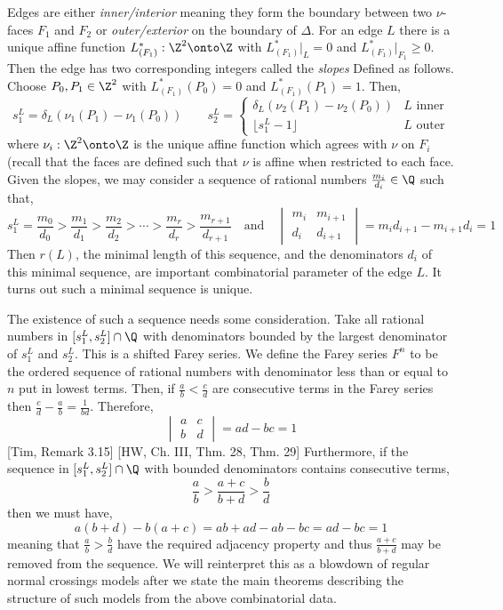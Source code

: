 \begin{defn}[Slopes]
Edges are either \textit{inner/interior} meaning they form the boundary between two $\nu$-faces $F_1$ and $F_2$ or \textit{outer/exterior} on the boundary of $\Delta$. For an edge $L$ there is a unique affine function $L^*_{(F_1)} : \Z^2 \onto \Z$ with $L^*_{(F_1)} |_L = 0$ and $L^*_{(F_1)}|_{F_1} \ge 0$. Then the edge has two corresponding integers called the \textit{slopes} Defined as follows. Choose $P_0, P_1 \in \Z^2$ with $L^*_{(F_1)}(P_0) = 0$ and $L_{(F_1)}^*(P_1) =1$. Then,
\[ s_1^L = \delta_L (\nu_1(P_1) - \nu_1(P_0)) \quad \quad s_2^L = 
\begin{cases}
\delta_L (\nu_2(P_1) - \nu_2(P_0)) & L \text{ inner}
\\
\lfloor s_1^L - 1 \rfloor & L \text{ outer}
\end{cases} \]
where $\nu_i : \Z^2 \onto \Z$ is the unique affine function which agrees with $\nu$ on $F_i$ (recall that the faces are defined such that $\nu$ is affine when restricted to each face. Given the slopes, we may consider a sequence of rational numbers $\frac{m_i}{d_i} \in \Q$ such that,
\[ s_1^L = \frac{m_0}{d_0} > \frac{m_1}{d_1} > \frac{m_2}{d_2} > \cdots > \frac{m_r}{d_r} > \frac{m_{r+1}}{d_{r+1}} \quad \text{and} \quad 
\begin{vmatrix}
m_i & m_{i+1}
\\
d_i & d_{i+1}
\end{vmatrix} = m_i d_{i+1} - m_{i+1} d_i = 1 \]
Then $r(L)$, the minimal length of this sequence, and the denominators $d_i$ of this minimal sequence, are important combinatorial parameter of the edge $L$. It turns out such a minimal sequence is unique.
\end{defn}

\begin{rmk}
The existence of such a sequence needs some consideration. Take all rational numbers in $[s_1^L, s_2^L] \cap \Q$ with denominators bounded by the largest denominator of $s_1^L$ and $s_2^L$. This is a shifted Farey series. We define the Farey series $F^n$ to be the ordered sequence of rational numbers with denominator less than or equal to $n$ put in lowest terms. Then, if $\frac{a}{b} < \frac{c}{d}$ are consecutive terms in the Farey series then $\frac{c}{d} - \frac{a}{b} = \frac{1}{bd}$. Therefore,
\[ \begin{vmatrix}
a & c 
\\
b & d 
\end{vmatrix}
= ad - bc = 1 \] 
[Tim, Remark 3.15] [HW, Ch. III, Thm. 28, Thm. 29]
Furthermore, if the sequence in $[s_1^L, s_2^L] \cap \Q$ with bounded denominators contains consecutive terms,
\[ \frac{a}{b} > \frac{a + c}{b + d} > \frac{b}{d} \]
then we must have,
\[ a(b + d) - b(a + c) = ab + ad - ab - bc = ad - bc = 1 \]
meaning that $\frac{a}{b} > \frac{b}{d}$ have the required adjacency property and thus $\frac{a + c}{b + d}$ may be removed from the sequence. We will reinterpret this as a blowdown of regular normal crossings models after we state the main theorems describing the structure of such models from the above combinatorial data.
\end{rmk}


